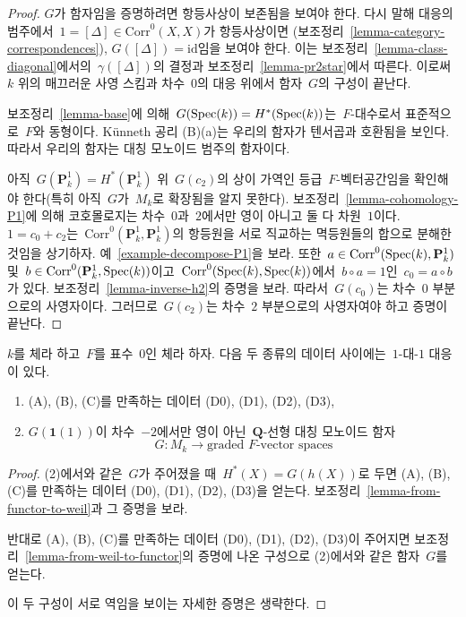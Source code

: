 \begin{proof}
\medskip\noindent
$G$가 함자임을 증명하려면 항등사상이 보존됨을 보여야 한다. 다시 말해
대응의 범주에서\  $1 = [\Delta] \in \text{Corr}^0(X, X)$가 항등사상이면
(보조정리\  \ref{lemma-category-correspondences}),
$G([\Delta]) = \text{id}$임을 보여야 한다. 이는 보조정리\ 
\ref{lemma-class-diagonal}에서의\  $\gamma([\Delta])$의 결정과 보조정리\ 
\ref{lemma-pr2star}에서 따른다. 이로써\  $k$ 위의 매끄러운 사영 스킴과
차수\  $0$의 대응 위에서 함자\  $G$의 구성이 끝난다.

\medskip\noindent
보조정리\  \ref{lemma-base}에 의해\ 
$G(\mathop{\mathrm{Spec}}(k)) = H^*(\mathop{\mathrm{Spec}}(k))$는\  $F$-대수로서 표준적으로\  $F$와
동형이다. K\"unneth 공리 (B)(a)는 우리의 함자가 텐서곱과 호환됨을
보인다. 따라서 우리의 함자는 대칭 모노이드 범주의 함자이다.

\medskip\noindent
아직\  $G(\mathbf{P}^1_k) = H^*(\mathbf{P}^1_k)$ 위\  $G(c_2)$의 상이
가역인 등급\  $F$-벡터공간임을 확인해야 한다(특히 아직\  $G$가\  $M_k$로
확장됨을 알지 못한다). 보조정리\  \ref{lemma-cohomology-P1}에 의해
코호몰로지는 차수\  $0$과\  $2$에서만 영이 아니고 둘 다 차원\  $1$이다.
$1 = c_0 + c_2$는\  $\text{Corr}^0(\mathbf{P}^1_k, \mathbf{P}^1_k)$의
항등원을 서로 직교하는 멱등원들의 합으로 분해한 것임을 상기하자.
예\  \ref{example-decompose-P1}을 보라. 또한\ 
$a \in \text{Corr}^0(\mathop{\mathrm{Spec}}(k), \mathbf{P}^1_k)$ 및\ 
$b \in \text{Corr}^0(\mathbf{P}^1_k, \mathop{\mathrm{Spec}}(k))$이고\ 
$\text{Corr}^0(\mathop{\mathrm{Spec}}(k), \mathop{\mathrm{Spec}}(k))$에서\  $b \circ a = 1$인\ 
$c_0 = a \circ b$가 있다. 보조정리\  \ref{lemma-inverse-h2}의 증명을
보라. 따라서\  $G(c_0)$는 차수\  $0$ 부분으로의 사영자이다. 그러므로\ 
$G(c_2)$는 차수\  $2$ 부분으로의 사영자여야 하고 증명이 끝난다.
\end{proof}

\begin{proposition}
\label{proposition-weil-cohomology-theory}
$k$를 체라 하고\  $F$를 표수\  $0$인 체라 하자. 다음 두 종류의 데이터
사이에는\  $1$-대-$1$ 대응이 있다.
\begin{enumerate}
\item (A), (B), (C)를 만족하는 데이터 (D0), (D1), (D2), (D3),
\item $G(\mathbf{1}(1))$이 차수\  $-2$에서만 영이 아닌\ 
$\mathbf{Q}$-선형 대칭 모노이드 함자
$$
G : M_k \longrightarrow \text{graded }F\text{-vector spaces}
$$
\end{enumerate}
\end{proposition}

\begin{proof}
(2)에서와 같은\  $G$가 주어졌을 때\  $H^*(X) = G(h(X))$로 두면
(A), (B), (C)를 만족하는 데이터 (D0), (D1), (D2), (D3)을 얻는다.
보조정리\  \ref{lemma-from-functor-to-weil}과 그 증명을 보라.

\medskip\noindent
반대로 (A), (B), (C)를 만족하는 데이터 (D0), (D1), (D2), (D3)이
주어지면 보조정리\  \ref{lemma-from-weil-to-functor}의 증명에 나온
구성으로 (2)에서와 같은 함자\  $G$를 얻는다.

\medskip\noindent
이 두 구성이 서로 역임을 보이는 자세한 증명은 생략한다.
\end{proof}











